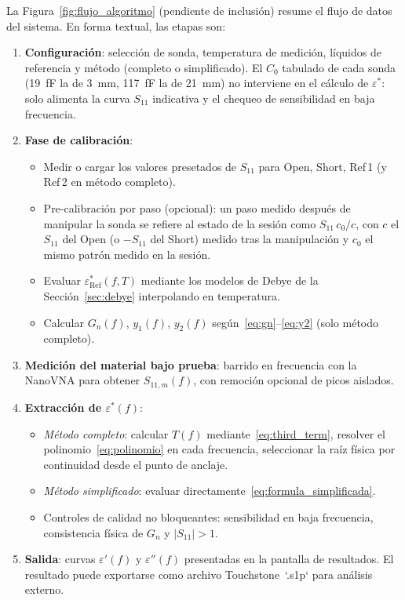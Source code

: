 La Figura~\ref{fig:flujo_algoritmo} (pendiente de inclusión) resume el flujo
de datos del sistema. En forma textual, las etapas son:

\begin{enumerate}
    \item \textbf{Configuración}: selección de sonda, temperatura de medición,
          líquidos de referencia y método (completo o simplificado). El $C_0$
          tabulado de cada sonda (19~fF la de 3~mm, 117~fF la de 21~mm) no
          interviene en el cálculo de $\varepsilon^*$: solo alimenta la curva
          $S_{11}$ indicativa y el chequeo de sensibilidad en baja frecuencia.

    \item \textbf{Fase de calibración}:
    \begin{itemize}
        \item Medir o cargar los valores presetados de $S_{11}$ para Open, Short,
              Ref\,1 (y Ref\,2 en método completo).
        \item Pre-calibración por paso (opcional): un paso medido después de
              manipular la sonda se refiere al estado de la sesión como
              $S_{11}\,c_0/c$, con $c$ el $S_{11}$ del Open (o $-S_{11}$ del Short)
              medido tras la manipulación y $c_0$ el mismo patrón medido en la
              sesión.
        \item Evaluar $\varepsilon_{\text{Ref}}^*(f, T)$ mediante los modelos de
              Debye de la Sección~\ref{sec:debye} interpolando en temperatura.
        \item Calcular $G_n(f)$, $y_1(f)$, $y_2(f)$
              según~\eqref{eq:gn}--\eqref{eq:y2} (solo método completo).
    \end{itemize}

    \item \textbf{Medición del material bajo prueba}: barrido en frecuencia con
          la NanoVNA para obtener $S_{11,m}(f)$, con remoción opcional de picos
          aislados.

    \item \textbf{Extracción de $\varepsilon^*(f)$}:
    \begin{itemize}
        \item \emph{Método completo}: calcular $T(f)$ mediante~\eqref{eq:third_term},
              resolver el polinomio~\eqref{eq:polinomio} en cada frecuencia,
              seleccionar la raíz física por continuidad desde el punto de anclaje.
        \item \emph{Método simplificado}: evaluar directamente~\eqref{eq:formula_simplificada}.
        \item Controles de calidad no bloqueantes: sensibilidad en baja
              frecuencia, consistencia física de $G_n$ y $|S_{11}| > 1$.
    \end{itemize}

    \item \textbf{Salida}: curvas $\varepsilon'(f)$ y $\varepsilon''(f)$
          presentadas en la pantalla de resultados. El resultado puede exportarse
          como archivo Touchstone~`.s1p` para análisis externo.
\end{enumerate}

